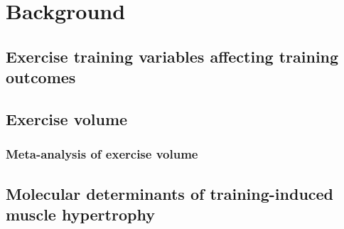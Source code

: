\documentclass[twoside,10pt]{gihclass} %
\begin{document}
\hypertarget{background}{%
\chapter{Background}\label{background}}

\hypertarget{exercise-training-variables-affecting-training-outcomes}{%
\section{Exercise training variables affecting training outcomes}\label{exercise-training-variables-affecting-training-outcomes}}

\hypertarget{exercise-volume}{%
\section{Exercise volume}\label{exercise-volume}}

\hypertarget{meta-analysis-of-exercise-volume}{%
\subsection{Meta-analysis of exercise volume}\label{meta-analysis-of-exercise-volume}}

\hypertarget{molecular-determinants-of-training-induced-muscle-hypertrophy}{%
\section{Molecular determinants of training-induced muscle hypertrophy}\label{molecular-determinants-of-training-induced-muscle-hypertrophy}}
\end{document}
